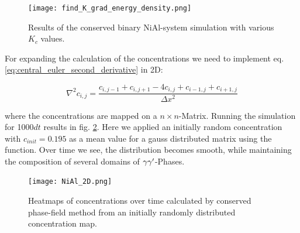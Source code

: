\begin{figure}[htb]
	\texttt{[image: find\_K\_grad\_energy\_density.png]} 
	\caption{Results of the conserved binary NiAl-system simulation with various \(K_{c}\) values.}
	\label{fig:vary_K}
\end{figure}

For expanding the calculation of the concentrations we need to implement eq. \ref{eq:central_euler_second_derivative} in 2D:

\begin{equation}
	\nabla^{2} c_{i,j} = \frac{c_{i,j-1} + c_{i,j+1} - 4c_{i, j} + c_{i-1, j} + c_{i+1, j}}{\Delta x^{2}} 
\end{equation}

where the concentrations are mapped on a \(n \times n\)-Matrix. Running the simulation for 1000\(dt\) results in fig. \ref{fig:NiAl_2D_heatmaps}. Here we applied an initially random concentration with \(c_{init} = 0.195\) as a mean value for a gauss distributed matrix using the  function. Over time we see, the distribution becomes smooth, while maintaining the composition of several domains of \(\gamma \\ \gamma '\)-Phases.

\begin{figure}
	\texttt{[image: NiAl\_2D.png]} 
	\caption{Heatmaps of concentrations over time calculated by conserved phase-field method from an initially randomly distributed concentration map.}
	\label{fig:NiAl_2D_heatmaps}
\end{figure}


\printbibliography




